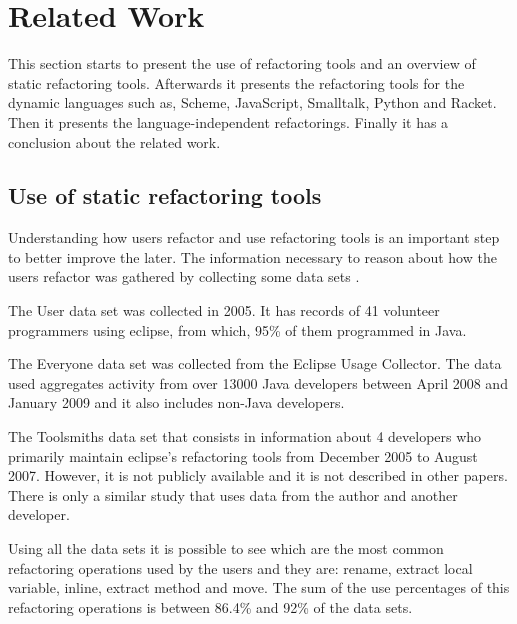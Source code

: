 
% 
% 

\section{Related Work}


This section starts to present the use of refactoring tools and an overview of static refactoring tools.
Afterwards it presents the refactoring tools for the dynamic languages such as, Scheme, JavaScript, Smalltalk, Python and Racket.
Then it presents the language-independent refactorings.
Finally it has a conclusion about the related work.

\subsection{Use of static refactoring tools}

Understanding how users refactor and use refactoring tools is an important step to better improve the later.
The information necessary to reason about how the users refactor was gathered by collecting some data sets \cite{murphy2012we}.


The User data set was collected \cite{murphy2006java} in 2005. It has records of 41 volunteer programmers using eclipse, from which, 95\% of them programmed in Java. %

The Everyone data set was collected from the Eclipse Usage Collector. The data used aggregates activity from over 13000 Java developers between April 2008 and January 2009 and it also includes non-Java developers.

The Toolsmiths data set that consists in information about 4 developers who primarily maintain eclipse's refactoring tools from December 2005 to August 2007. 
However, it is not publicly available and it is not described in other papers.
There is only a similar study \cite{robbes2007mining} that uses data from the author and another developer. 


Using all the data sets it is possible to see which are the most common refactoring operations used by the users and they are: rename, extract local variable, inline, extract method and move. The sum of the use percentages of this refactoring operations is between 86.4\% and 92\% of the data sets. %


